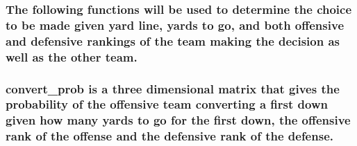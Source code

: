 \documentclass[letterpaper,10pt,english]{/anaconda/lib/python2.7/site-packages/sphinx/texinputs/sphinxhowto}
\begin{document}
        
    


\subsubsection{The following functions will be used to determine the choice to be made
given yard line, yards to go, and both offensive and defensive rankings
of the team making the decision as well as the other team.}















\subsubsection{convert\_prob is a three dimensional matrix that gives the probability
of the offensive team converting a first down given how many yards to go
for the first down, the offensive rank of the offense and the defensive
rank of the defense.}
\end{document}
